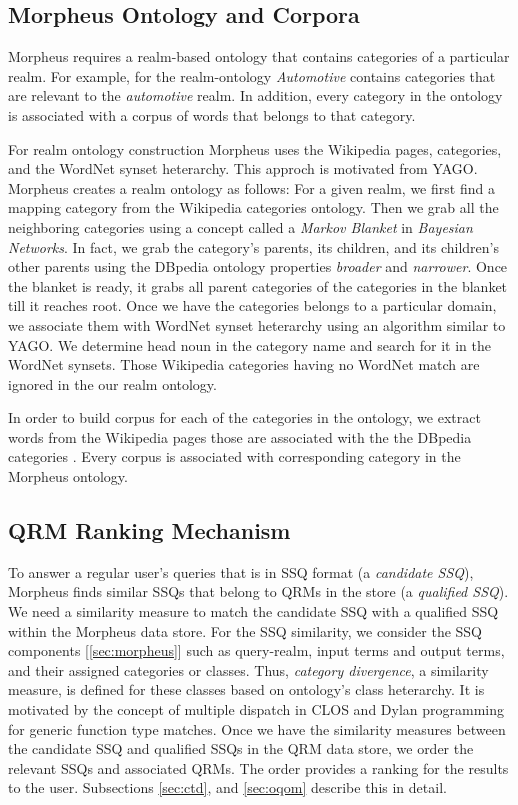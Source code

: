 \subsection{Morpheus Ontology and Corpora} 

Morpheus requires a realm-based ontology that contains categories of a
particular realm. For example, for the realm-ontology \textit{Automotive}
contains categories that are relevant to the \textit{automotive} realm. In
addition, every category in the ontology is associated with a corpus of words
that belongs to that category.   

For realm ontology construction Morpheus uses the Wikipedia pages, categories,
and the WordNet synset heterarchy. This approch is motivated from
YAGO\cite{Suchanek2009phd}. Morpheus creates a realm ontology as follows: For a
given realm, we first find a mapping category from the Wikipedia categories 
ontology. Then we grab all the neighboring categories
using a concept called a \textit{Markov Blanket} \cite{PRIS} in \textit{Bayesian
Networks}. In fact, we grab the category's parents, its children, and its 
children's other parents using the DBpedia ontology properties \textit{broader}
and \textit{narrower}. Once the blanket is ready, it grabs all parent categories
of the categories in the blanket till it reaches root. Once we have the
categories belongs to a particular domain, we associate them with WordNet synset
heterarchy using an algorithm similar to YAGO. We determine head noun in the
category name and search for it in the WordNet synsets\cite{Suchanek2009phd}.
Those Wikipedia categories having no WordNet match are ignored in the our realm
ontology.   

In order to build corpus for each of the categories in the ontology, 
we extract words from the Wikipedia pages those are associated with the 
the DBpedia categories \cite{Auer07dbpedia:a}. Every corpus is associated 
with corresponding category in the Morpheus ontology.  

\subsection{QRM Ranking Mechanism} 

To answer a regular user's queries that is in SSQ format (a \textit{candidate
SSQ}), Morpheus finds similar SSQs that belong to QRMs in the store (a
\textit{qualified SSQ}). We need a similarity measure to match the candidate SSQ
with a qualified SSQ within the Morpheus data store. For the SSQ similarity, we
consider the SSQ components [\ref{sec:morpheus}] such as query-realm, input
terms and output terms, and their assigned categories or classes. Thus,
\textit{category divergence}, a similarity measure, is defined for these classes
based on ontology's class heterarchy. It is motivated by the concept of multiple
dispatch in CLOS \cite{Steele1990} and Dylan programming \cite{Barrett1996} for
generic function type matches. Once we have the similarity measures between the
candidate SSQ and qualified SSQs in the QRM data store, we order the relevant
SSQs and associated QRMs. The order provides a ranking for the results to the
user. Subsections \ref{sec:ctd}, and \ref{sec:oqom} describe this in detail.

